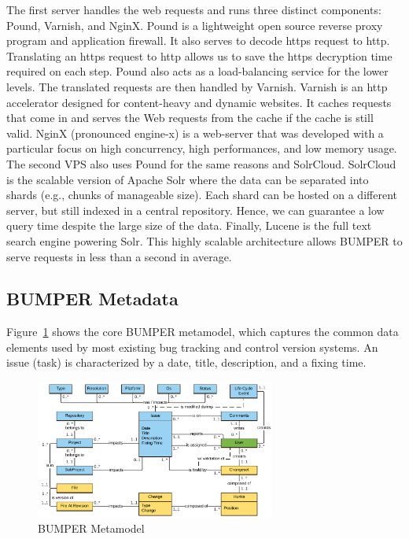 \documentclass[conference]{IEEEtran}
\begin{document}
The first server handles the web requests and
runs three distinct components: Pound, Varnish, and NginX.
Pound is a lightweight open source reverse proxy program
and application firewall.
It also serves to decode https request to http.
Translating an https request to http allows us to save the https decryption
time required on each step.
Pound also acts as a load-balancing service for the lower levels.
The translated requests are then handled by Varnish.
Varnish is an http accelerator designed for content-heavy and dynamic websites.
It caches requests that come in and serves the Web requests from the cache if the cache is still valid.
NginX (pronounced engine-x) is a web-server that was developed with a particular
focus on high concurrency, high performances, and low memory usage.
The second VPS also uses Pound for the same reasons and SolrCloud.
SolrCloud is the scalable version of Apache Solr where the data can be separated
into shards (e.g., chunks of manageable size).
Each shard can be hosted on a different server, but still indexed in a central
repository.
Hence, we can guarantee a low query time despite the  large size of the data.
Finally, Lucene is the full text search engine powering Solr.
This highly scalable architecture allows BUMPER to serve requests in less than
a second in average.

\subsection{BUMPER Metadata}
\label{sub:BUMPER Metadata}

Figure~\ref{fig:bumper-metamodel}  shows the core BUMPER metamodel,
which captures the common data elements used by most existing
bug tracking and control version systems. An issue (task) is
characterized by a date, title, description, and a fixing time.

\begin{figure}
  \centering
  \includegraphics[width=0.7\textwidth]{media/Bumper-Model.png}
  \caption{BUMPER Metamodel\label{fig:bumper-metamodel}}
\vspace{-1.8em}
\end{figure}
\end{document}
